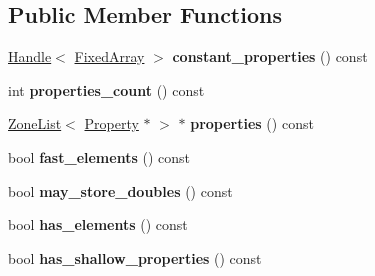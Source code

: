 \subsection*{Public Member Functions}
\begin{DoxyCompactItemize}
\item 
\hyperlink{classv8_1_1internal_1_1_handle}{Handle}$<$ \hyperlink{classv8_1_1internal_1_1_fixed_array}{Fixed\+Array} $>$ {\bfseries constant\+\_\+properties} () const \hypertarget{classv8_1_1internal_1_1_object_literal_a145ccf77a49a840d3e550f69dbcad983}{}\label{classv8_1_1internal_1_1_object_literal_a145ccf77a49a840d3e550f69dbcad983}

\item 
int {\bfseries properties\+\_\+count} () const \hypertarget{classv8_1_1internal_1_1_object_literal_ab557362675fc6137ec8f492905a33fd0}{}\label{classv8_1_1internal_1_1_object_literal_ab557362675fc6137ec8f492905a33fd0}

\item 
\hyperlink{classv8_1_1internal_1_1_zone_list}{Zone\+List}$<$ \hyperlink{classv8_1_1internal_1_1_object_literal_property}{Property} $\ast$ $>$ $\ast$ {\bfseries properties} () const \hypertarget{classv8_1_1internal_1_1_object_literal_a2465620c358ebb85eeb0ee6ca8c382ad}{}\label{classv8_1_1internal_1_1_object_literal_a2465620c358ebb85eeb0ee6ca8c382ad}

\item 
bool {\bfseries fast\+\_\+elements} () const \hypertarget{classv8_1_1internal_1_1_object_literal_ad003cd56a784bb70d1ab991297cd0ba8}{}\label{classv8_1_1internal_1_1_object_literal_ad003cd56a784bb70d1ab991297cd0ba8}

\item 
bool {\bfseries may\+\_\+store\+\_\+doubles} () const \hypertarget{classv8_1_1internal_1_1_object_literal_a9ddf24831aff99f5157244131af0d889}{}\label{classv8_1_1internal_1_1_object_literal_a9ddf24831aff99f5157244131af0d889}

\item 
bool {\bfseries has\+\_\+elements} () const \hypertarget{classv8_1_1internal_1_1_object_literal_ab0a58ccda8a814dfdd91c57e0b59f6ae}{}\label{classv8_1_1internal_1_1_object_literal_ab0a58ccda8a814dfdd91c57e0b59f6ae}

\item 
bool {\bfseries has\+\_\+shallow\+\_\+properties} () const \hypertarget{classv8_1_1internal_1_1_object_literal_a007de7e9a1b1cdb1296194ae03e1623d}{}\label{classv8_1_1internal_1_1_object_literal_a007de7e9a1b1cdb1296194ae03e1623d}


\end{DoxyCompactItemize}
